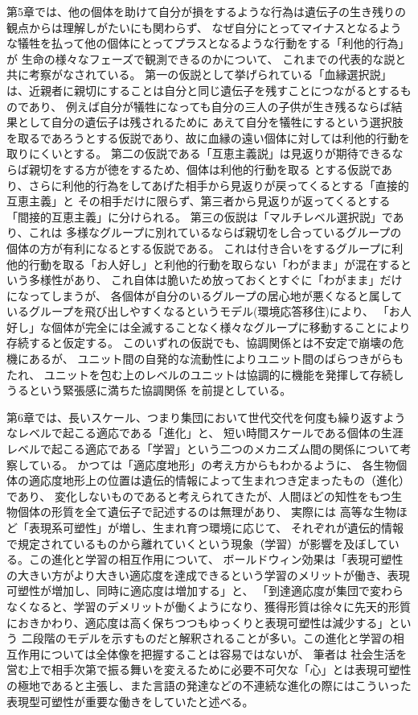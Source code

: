\documentclass[uplatex]{jsarticle}
\begin{document}
第5章では、他の個体を助けて自分が損をするような行為は遺伝子の生き残りの観点からは理解しがたいにも関わらず、
なぜ自分にとってマイナスとなるような犠牲を払って他の個体にとってプラスとなるような行動をする「利他的行為」が
生命の様々なフェーズで観測できるのかについて、
これまでの代表的な説と共に考察がなされている。
第一の仮説として挙げられている「血縁選択説」は、近親者に親切にすることは自分と同じ遺伝子を残すことにつながるとするものであり、
例えば自分が犠牲になっても自分の三人の子供が生き残るならば結果として自分の遺伝子は残されるために
あえて自分を犠牲にするという選択肢を取るであろうとする仮説であり、故に血縁の遠い個体に対しては利他的行動を
取りにくいとする。
第二の仮説である「互恵主義説」は見返りが期待できるならば親切をする方が徳をするため、個体は利他的行動を取る
とする仮説であり、さらに利他的行為をしてあげた相手から見返りが戻ってくるとする「直接的互恵主義」と
その相手だけに限らず、第三者から見返りが返ってくるとする「間接的互恵主義」に分けられる。
第三の仮説は「マルチレベル選択説」であり、これは
多様なグループに別れているならば親切をし合っているグループの個体の方が有利になるとする仮説である。
これは付き合いをするグループに利他的行動を取る「お人好し」と利他的行動を取らない「わがまま」が混在するという多様性があり、
これ自体は脆いため放っておくとすぐに「わがまま」だけになってしまうが、
各個体が自分のいるグループの居心地が悪くなると属しているグループを飛び出しやすくなるというモデル(環境応答移住)により、
「お人好し」な個体が完全には全滅することなく様々なグループに移動することにより存続すると仮定する。
このいずれの仮説でも、協調関係とは不安定で崩壊の危機にあるが、
ユニット間の自発的な流動性によりユニット間のばらつきがらもたれ、
ユニットを包む上のレベルのユニットは協調的に機能を発揮して存続しうるという緊張感に満ちた協調関係
を前提としている。

第6章では、長いスケール、つまり集団において世代交代を何度も繰り返すようなレベルで起こる適応である「進化」と、
短い時間スケールである個体の生涯レベルで起こる適応である「学習」という二つのメカニズム間の関係について考察している。
かつては「適応度地形」の考え方からもわかるように、
各生物個体の適応度地形上の位置は遺伝的情報によって生まれつき定まったもの（進化）であり、
変化しないものであると考えられてきたが、人間ほどの知性をもつ生物個体の形質を全て遺伝子で記述するのは無理があり、
実際には 高等な生物ほど「表現系可塑性」が増し、生まれ育つ環境に応じて、
それぞれが遺伝的情報で規定されているものから離れていくという現象（学習）が影響を及ぼしている。この進化と学習の相互作用について、
ボールドウィン効果は「表現可塑性の大きい方がより大きい適応度を達成できるという学習のメリットが働き、表現可塑性が増加し、同時に適応度は増加する」と、
「到達適応度が集団で変わらなくなると、学習のデメリットが働くようになり、獲得形質は徐々に先天的形質におきかわり、適応度は高く保ちつつもゆっくりと表現可塑性は減少する」という
二段階のモデルを示すものだと解釈されることが多い。この進化と学習の相互作用については全体像を把握することは容易ではないが、
筆者は 社会生活を営む上で相手次第で振る舞いを変えるために必要不可欠な「心」とは表現可塑性の極地であると主張し、また言語の発達などの不連続な進化の際にはこういった
表現型可塑性が重要な働きをしていたと述べる。
\end{document}
